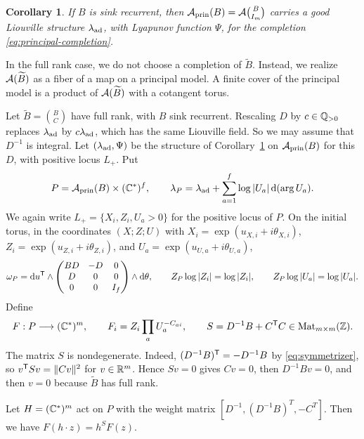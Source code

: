 \documentclass[12pt, letter]{amsart}
\newtheorem{corollary}[dummy]{Corollary}
\theoremstyle{definition}
\begin{document}
\begin{corollary}\label{cor:principal-geometry}
If $B$ is sink recurrent, then $\mathcal{A}_{\mathrm{prin}}(B)=\mathcal{A}\binom B{I_m}$ carries a good Liouville structure $\lambda_{\mathrm{ad}}$, with Lyapunov function $\Psi$, for the completion \eqref{eq:principal-completion}.
\end{corollary}


In the full rank case, we do not choose a completion of $\widetilde B$.
Instead, we realize $\mathcal{A}(\widetilde B)$ as a fiber of a map on a principal model.
A finite cover of the principal model is a product of $\mathcal{A}(\widetilde B)$ with a cotangent torus.

Let $\widetilde B=\binom BC$ have full rank, with $B$ sink recurrent.
Rescaling $D$ by $c\in\mathbb{Q}_{>0}$ replaces $\lambda_{\mathrm{ad}}$ by $c\lambda_{\mathrm{ad}}$, which has the same Liouville field.
So we may assume that $D^{-1}$ is integral.
Let $(\lambda_{\mathrm{ad}},\Psi)$ be the structure of Corollary~\ref{cor:principal-geometry} on $\mathcal{A}_{\mathrm{prin}}(B)$ for this $D$, with positive locus $L_+$.
Put
\[
 P=\mathcal{A}_{\mathrm{prin}}(B)\times(\mathbb{C}^*)^f,\qquad
 \lambda_P=\lambda_{\mathrm{ad}}+\sum_{a=1}^f\log|U_a|\,\mathrm{d}(\arg U_a) .
\]
We again write $L_+=\{X_i,Z_i,U_a>0\}$ for the positive locus of $P$.
On the initial torus, in the coordinates $(X;Z;U)$ with $X_i=\exp({u_{X,i}+i\theta_{X,i}})$, $Z_i=\exp({u_{Z,i}+i\theta_{Z,i}})$, and $U_a=\exp({u_{U,a}+i\theta_{U,a}})$, 
\begin{equation}\label{eq:principal-form}
 \omega_P
 = \mathrm{d} u^{\mathsf T} \wedge 
 \begin{pmatrix}
 BD&-D&0\\D&0&0\\0&0&I_f
 \end{pmatrix}
 \wedge \mathrm{d}\theta, \qquad 
 Z_P\log|Z_i|=\log|Z_i|,\qquad
 Z_P\log|U_a|=\log|U_a| .
\end{equation}
Define
\begin{equation}\label{eq:frozen-map}
 F:P\longrightarrow(\mathbb{C}^*)^m,\qquad F_i=Z_i\prod_a U_a^{-C_{ai}},\qquad
 S=D^{-1}B+C^{\mathsf T}C\in\operatorname{Mat}_{m\times m}(\mathbb{Z}).
\end{equation}
The matrix $S$ is nondegenerate.
Indeed, $(D^{-1}B)^{\mathsf T}=-D^{-1}B$ by \eqref{eq:symmetrizer}, so $v^{\mathsf T}Sv=\lVert Cv\rVert^2$ for $v\in\mathbb{R}^m$.
Hence $Sv=0$ gives $Cv=0$, then $D^{-1}Bv=0$, and then $v=0$ because $\widetilde B$ has full rank. 

Let  \(H = (\mathbb{C}^*)^m \) act on \(P\) with the weight matrix \( [ D^{-1}, (D^{-1} B)^T, -C^T]\).  Then
we have
\(
F(h\cdot z)=h^S F(z)
\). 
\end{document}
